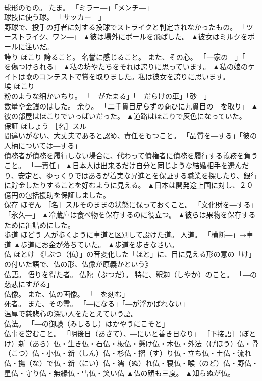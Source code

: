\documentclass[8pt]{extreport}
\begin{document}
\begin{CJK}{UTF8}{min}
\\	球形のもの。 たま。 「ミラー―」「メンチ―」 
\\	球技に使う球。 「サッカー―」 
\\	野球で、投手の打者に対する投球でストライクと判定されなかったもの。 「ツーストライク、ワン―」	▲彼は場外にボールを飛ばした。 ▲彼女はミルクをボールに注いだ。
\\	誇り	ほこり	誇ること。 名誉に感じること。 また、その心。 「一家の―」「―を傷つけられる」	▲私の坊やたちをそれは誇りに思っています。 ▲私の娘のケイトは歌のコンテストで賞を取りました。私は彼女を誇りに思います。
\\	埃	ほこり	
\\	粉のような細かいちり。 「―がたまる」「―だらけの車」「砂―」 
\\	数量や金銭のはした。 余り。 「二千貫目足らずの商ひに九貫目の―を取り」	▲彼の部屋はほこりでいっぱいだった。 ▲道路はほこりで灰色になっていた。
\\	保証	ほしょう	［名］スル 
\\	間違いがない、大丈夫であると認め、責任をもつこと。 「品質を―する」「彼の人柄については―する」 
\\	債務者が債務を履行しない場合に、代わって債権者に債務を履行する義務を負うこと。 「―責任」	▲日本人は出来るだけ自分と同じような結婚相手を選んだり、安定と、ゆっくりではあるが着実な昇進とを保証する職業を探したり、銀行に貯金したりすることを好むように見える。 ▲日本は開発途上国に対し、２０億円の包括援助を保証しました。
\\	保存	ほぞん	［名］スルそのままの状態に保っておくこと。 「文化財を―する」「永久―」	▲冷蔵庫は食べ物を保存するのに役立つ。 ▲彼らは果物を保存するために缶詰めにした。
\\	歩道	ほどう	人が歩くように車道と区別して設けた道。 人道。 「横断―」→車道	▲歩道にお金が落ちていた。 ▲歩道を歩きなさい。
\\	仏	ほとけ	《「ぶつ（仏）」の音変化した「ほと」に、目に見える形の意の「け」の付いた語で、仏の形、仏像が原義かという》 
\\	仏語。 悟りを得た者。 仏陀（ぶつだ）。 特に、釈迦（しやか）のこと。 「―の慈悲にすがる」 
\\	仏像。 また、仏の画像。 「―を刻む」 
\\	死者。 また、その霊。 「―になる」「―が浮かばれない」 
\\	温厚で慈悲心の深い人をたとえていう語。 
\\	仏法。 「―の御験（みしるし）はかやうにこそと」 
\\	仏事を営むこと。 「明後日（あさて）、―にいと善き日なり」 ［下接語］（ぼとけ）新（あら）仏・生き仏・石仏・板仏・懸け仏・木仏・外法（げほう）仏・骨（こつ）仏・小仏・新（しん）仏・杉仏・摺（す）り仏・立ち仏・土仏・流れ仏・撫（な）で仏・新（にい）仏・濡（ぬ）れ仏・寝仏・喉（のど）仏・野仏・星仏・守り仏・無縁仏・雪仏・笑い仏	▲仏の顔も三度。 ▲知らぬが仏。

\end{CJK}
\end{document}
